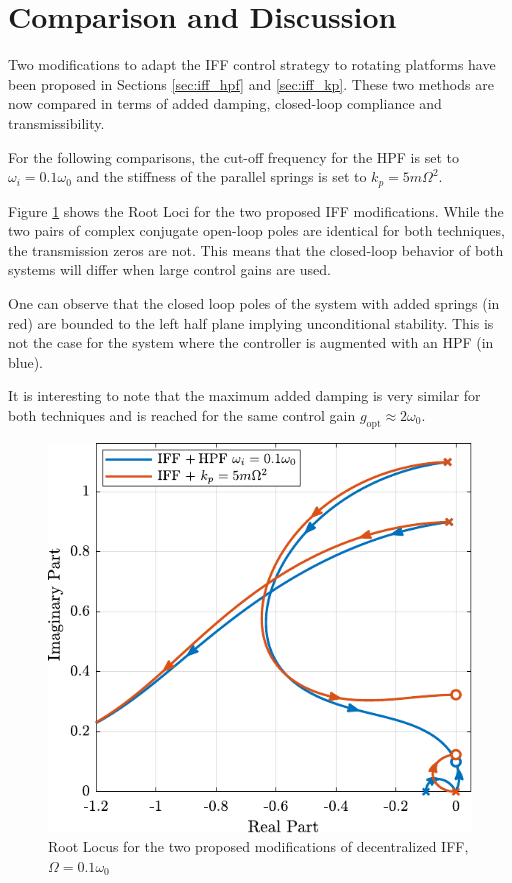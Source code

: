 \documentclass[Afour,sagev,times]{sagej}
\begin{document}
\section{Comparison and Discussion}
\label{sec:orgcd508a8}
\label{sec:comparison}
Two modifications to adapt the IFF control strategy to rotating platforms have been proposed in Sections \ref{sec:iff_hpf} and \ref{sec:iff_kp}.
These two methods are now compared in terms of added damping, closed-loop compliance and transmissibility.

For the following comparisons, the cut-off frequency for the HPF is set to \(\omega_i = 0.1 \omega_0\) and the stiffness of the parallel springs is set to \(k_p = 5 m \Omega^2\).

\par
Figure \ref{fig:comp_root_locus} shows the Root Loci for the two proposed IFF modifications.
While the two pairs of complex conjugate open-loop poles are identical for both techniques, the transmission zeros are not.
This means that the closed-loop behavior of both systems will differ when large control gains are used.

One can observe that the closed loop poles of the system with added springs (in red) are bounded to the left half plane implying unconditional stability.
This is not the case for the system where the controller is augmented with an HPF (in blue).

It is interesting to note that the maximum added damping is very similar for both techniques and is reached for the same control gain \(g_\text{opt} \approx 2 \omega_0\).

\begin{figure}[htbp]
\centering
\includegraphics[width=\linewidth]{figs/comp_root_locus.pdf}
\caption{\label{fig:comp_root_locus}Root Locus for the two proposed modifications of decentralized IFF, \(\Omega = 0.1 \omega_0\)}
\end{figure}
\end{document}
